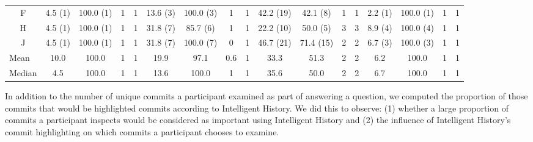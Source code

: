 \begin{landscape}
\begin{table}
{\begin{tabular}{@{}ccccccccccccccccc@{}}
        \multicolumn{1}{c|}{F}              & 4.5 (1)  & 100.0 (1) & 1    & \multicolumn{1}{c|}{1}    & 13.6 (3)                 & 100.0 (3)                & 1                        & \multicolumn{1}{c|}{1}    & 42.2 (19) & 42.1 (8)                 & 1                        & \multicolumn{1}{c|}{1}    & 2.2 (1)                  & 100.0 (1)                & 1                        & 1                        \\
        \multicolumn{1}{c|}{H}              & 4.5 (1)  & 100.0 (1) & 1    & \multicolumn{1}{c|}{1}    & 31.8 (7)                 & 85.7 (6)                 & 1                        & \multicolumn{1}{c|}{1}    & 22.2 (10) & 50.0 (5)                 & 3                        & \multicolumn{1}{c|}{3}    & 8.9 (4)                  & 100.0 (4)                & 1                        & 1                        \\
        \multicolumn{1}{c|}{J}              & 4.5 (1)  & 100.0 (1) & 1    & \multicolumn{1}{c|}{1}    & 31.8 (7)                 & 100.0 (7)                & 0                        & \multicolumn{1}{c|}{1}    & 46.7 (21) & 71.4 (15)                & 2                        & \multicolumn{1}{c|}{2}    & 6.7 (3)                  & 100.0 (3)                & 1                        & 1                        \\ \midrule
        \multicolumn{1}{l|}{Mean}           & 10.0     & 100.0     & 1    & \multicolumn{1}{c|}{1}    & 19.9                     & 97.1                     & 0.6                      & \multicolumn{1}{c|}{1}    & 33.3      & 51.3                     & 2                        & \multicolumn{1}{c|}{2}    & 6.2                      & 100.0                    & 1                        & 1                        \\
        \multicolumn{1}{l|}{Median}         & 4.5      & 100.0     & 1    & \multicolumn{1}{c|}{1}    & 13.6                     & 100.0                    & 1                        & \multicolumn{1}{c|}{1}    & 35.6      & 50.0                     & 2                        & \multicolumn{1}{c|}{2}    & 6.7                      & 100.0                    & 1                        & 1                        \\ \bottomrule
      \end{tabular}
    }%
    \label{tab:Results-Quantitative-BA}
  \end{table}
\end{landscape}

In addition to the number of unique commits a participant examined as part of answering a question,
we computed the proportion of those commits that would be highlighted commits according to Intelligent History.
We did this to observe:
(1) whether a large proportion of commits a participant inspects would be considered as important using Intelligent History
and (2) the influence of Intelligent History's commit highlighting on which commits a participant chooses to examine.

